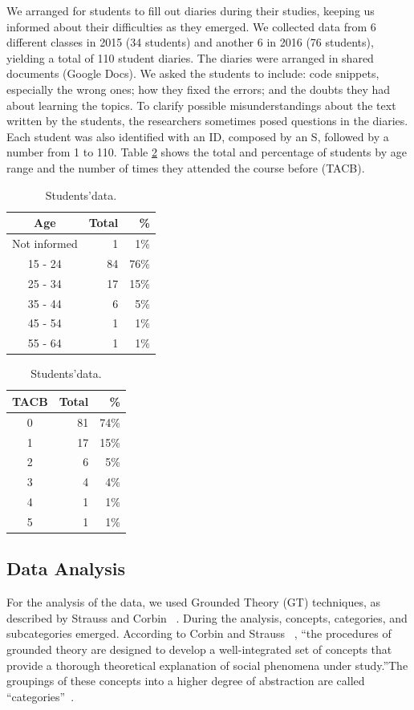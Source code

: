 \documentclass[sigconf]{acmart}
\begin{document}
We arranged for students to fill out diaries during their studies, keeping us informed about their difficulties as they emerged. We collected data from 6 different classes in 2015 (34 students) and another 6 in 2016 (76 students), yielding a total of 110 student diaries. The diaries were arranged in shared documents (Google Docs). We asked the students to include: code snippets, especially the wrong ones; how they fixed the errors; and the doubts they had about learning the topics. To clarify possible misunderstandings about the text written by the students, the researchers sometimes posed questions in the diaries. Each student was also identified with an ID, composed by an S, followed by a number from 1 to 110. Table \ref{tab:students} shows the total and percentage of students by age range and the number of times they attended the course before (TACB).

 \begin{table}
  \caption{Students\textquoteright \space  data.}
  \label{tab:students}
  \begin{tabular}{crr}
    \toprule
    Age&Total&\%\\
    \midrule
    Not informed &  1 &  1\% \\
    15 - 24      & 84 & 76\% \\
    25 - 34      & 17 & 15\% \\
    35 - 44      &  6 &  5\% \\
    45 - 54      &  1 &  1\% \\
    55 - 64      &  1 &  1\% \\
  	\bottomrule
  \end{tabular}
  \space \space \space \space \space
  \begin{tabular}{crr}
    \toprule
    TACB&Total& \% \\
    \midrule
    0 & 81 & 74\% \\
    1 & 17 & 15\% \\
    2 & 6 & 5\% \\
    3 & 4 & 4\% \\
    4 & 1 & 1\% \\
    5 & 1 & 1\% \\
  	\bottomrule
  \end{tabular}
\end{table}


\subsection{Data Analysis}
For the analysis of the data, we used Grounded Theory (GT) techniques, as described by Strauss and Corbin ~\cite{Strauss15}. During the analysis, concepts, categories, and subcategories emerged. According to Corbin and Strauss ~\cite{Strauss90}, \textquotedblleft the procedures of grounded theory are designed to develop a well-integrated set of concepts that provide a thorough theoretical explanation of social phenomena under study.\textquotedblright \space The groupings of these concepts into a higher degree of abstraction are called \textquotedblleft categories\textquotedblright \space ~\cite{Strauss15}. 
\end{document}
